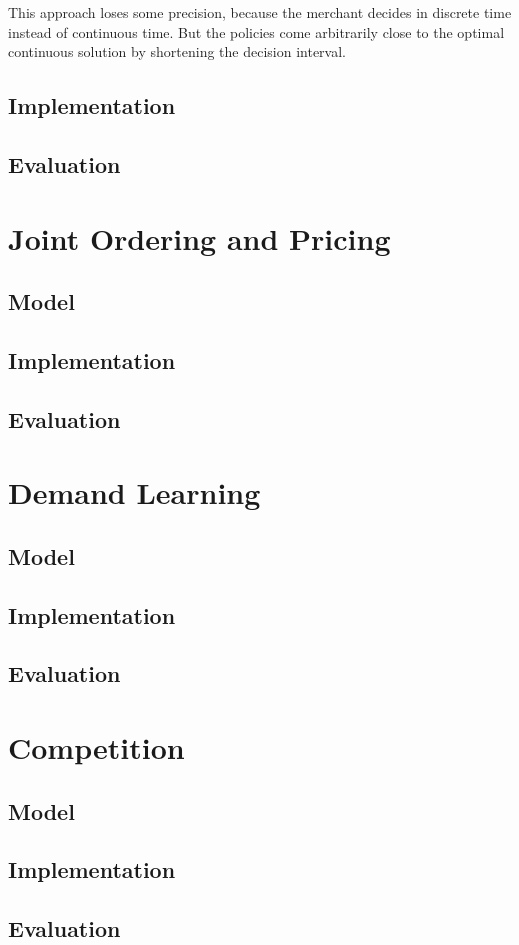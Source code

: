 This approach loses some precision, because the merchant decides in discrete time instead of continuous time.
But the policies come arbitrarily close to the optimal continuous solution by shortening the decision interval.

\subsection{Implementation}
\subsection{Evaluation}

\section{Joint Ordering and Pricing}
\subsection{Model}
\subsection{Implementation}
\subsection{Evaluation}

\section{Demand Learning}
\subsection{Model}
\subsection{Implementation}
\subsection{Evaluation}

\section{Competition}
\subsection{Model}
\subsection{Implementation}
\subsection{Evaluation}

